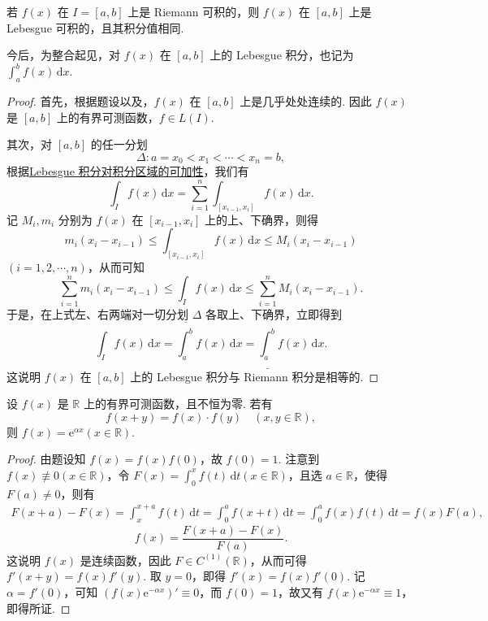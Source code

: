 \documentclass[../../main.tex]{subfiles}%
\begin{document}
\begin{theorem}\label{theorem:定理4.25}
若 \( f(x) \) 在 \( I = [a,b] \) 上是 Riemann 可积的，则 \( f(x) \) 在 \( [a,b] \) 上是 Lebesgue 可积的，且其积分值相同.
\end{theorem}
\begin{remark}
今后，为整合起见，对 \( f(x) \) 在 \( [a,b] \) 上的 Lebesgue 积分，也记为$\int_a^b f(x) \, \mathrm{d}x.$
\end{remark}
\begin{proof}

首先，根据题设以及，\( f(x) \) 在 \( [a,b] \) 上是几乎处处连续的. 因此 \( f(x) \) 是 \( [a,b] \) 上的有界可测函数，\( f \in L(I) \).

其次，对 \( [a,b] \) 的任一分划
\[
\Delta: a = x_0 < x_1 < \cdots < x_n = b,
\]
根据\hyperref[theorem:积分对定义域的可数可加性]{Lebesgue 积分对积分区域的可加性}，我们有
\[
\int_I f(x) \, \mathrm{d}x = \sum_{i=1}^n \int_{[x_{i-1}, x_i]} f(x) \, \mathrm{d}x.
\]
记 \( M_i, m_i \) 分别为 \( f(x) \) 在 \( [x_{i-1}, x_i] \) 上的上、下确界，则得
\[
m_i (x_i - x_{i-1}) \leqslant  \int_{[x_{i-1}, x_i]} f(x) \, \mathrm{d}x \leqslant  M_i (x_i - x_{i-1})
\]
\( (i = 1,2,\cdots,n) \)，从而可知
\[
\sum_{i=1}^n m_i (x_i - x_{i-1}) \leqslant  \int_I f(x) \, \mathrm{d}x \leqslant  \sum_{i=1}^n M_i (x_i - x_{i-1}).
\]
于是，在上式左、右两端对一切分划 \( \Delta \) 各取上、下确界，立即得到
\[
\int_I f(x) \, \mathrm{d}x = \overline{\int_a^b} f(x) \, \mathrm{d}x = \underline{\int_a^b} f(x) \, \mathrm{d}x.
\]
这说明 \( f(x) \) 在 \( [a,b] \) 上的 Lebesgue 积分与 Riemann 积分是相等的.

\end{proof}

\begin{proposition}
设 \( f(x) \) 是 \( \mathbb{R} \) 上的有界可测函数，且不恒为零. 若有
\[
f(x + y) = f(x) \cdot f(y) \quad (x, y \in \mathbb{R}),
\]
则 \( f(x) = \mathrm{e}^{\alpha x} (x \in \mathbb{R}) \).
\end{proposition}
\begin{proof}

由题设知 \( f(x) = f(x)f(0) \)，故 \( f(0) = 1 \). 注意到 \( f(x) \not\equiv 0 (x \in \mathbb{R}) \)，令 \( F(x) = \int_0^x f(t) \, \mathrm{d}t (x \in \mathbb{R}) \)，且选 \( a \in \mathbb{R} \)，使得 \( F(a) \neq 0 \)，则有
\begin{align*}
F(x + a) - F(x) = \int_x^{x + a} f(t) \, \mathrm{d}t = \int_0^a f(x + t) \, \mathrm{d}t 
= \int_0^a f(x)f(t) \, \mathrm{d}t = f(x)F(a),
\end{align*}
\[
f(x) = \frac{F(x + a) - F(x)}{F(a)}.
\]
这说明 \( f(x) \) 是连续函数，因此 \( F \in C^{(1)}(\mathbb{R}) \)，从而可得 \( f'(x + y) = f(x)f'(y) \). 取 \( y = 0 \)，即得 \( f'(x) = f(x)f'(0) \). 记 \( \alpha = f'(0) \)，可知 \( (f(x)\mathrm{e}^{-\alpha x})' \equiv 0 \)，而 \( f(0) = 1 \)，故又有 \( f(x)\mathrm{e}^{-\alpha x} \equiv 1 \)，即得所证.

\end{proof}
\end{document}
